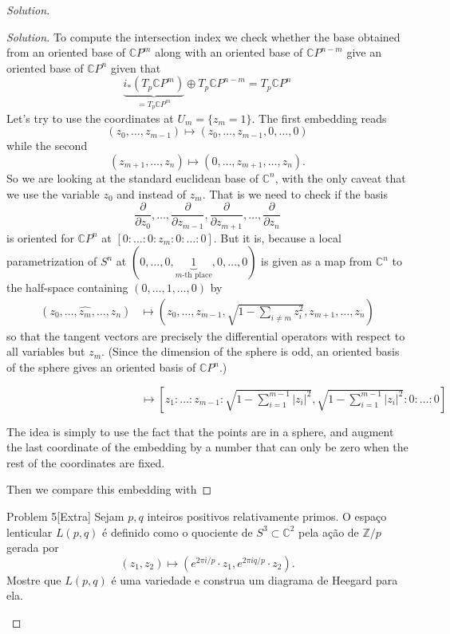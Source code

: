 \begin{proof}[Solution]
\begin{proof}[Solution]
To compute the intersection index we check whether the base obtained from an oriented base of \(\mathbb{C}P^{m}\) along with an oriented base of \(\mathbb{C}P^{n-m}\) give an oriented base of \(\mathbb{C}P^{n}\) given that
\[\underbrace{i_*(T_p \mathbb{C}P^{m})}_{=T_p\mathbb{C}P^m}\oplus T_p\mathbb{C}P^{n-m}=T_p\mathbb{C}P^{n}\]
Let's try to use the coordinates at \(U_m=\{z_m=1\}\). The first embedding reads
\[(z_0,\ldots,z_{m-1})\mapsto (z_0,\ldots,z_{m-1},0,\ldots,0)\]
while the second
\[(z_{m+1},\ldots,z_n)\mapsto (0,\ldots,z_{m+1},\ldots,z_n).\]
So we are looking at the standard euclidean base of \(\mathbb{C}^n\), with the only caveat that we use the variable \(z_0\) and instead of \(z_m\). That is we need to check if the basis
\[\frac{\partial }{\partial z_0},\ldots,\frac{\partial }{\partial z_{m-1}},\frac{\partial }{\partial z_{m+1}},\ldots,\frac{\partial }{\partial z_n}\]
is oriented for \(\mathbb{C}P^{n}\) at \([0:\ldots:0:z_m:0:\ldots:0]\). But it is, because a local parametrization of \(S^{n}\) at \((0,\ldots,0,\underbrace{1}_{m\text{-th place} },0,\ldots,0)\) is given as a map from \(\mathbb{C}^n\) to the half-space containing \((0,\ldots,1,\ldots,0)\) by
\begin{align*}
	(z_0,\ldots,\widehat{z_m},\ldots,z_n) &\longmapsto \left(z_0,\ldots,z_{m-1},\sqrt{1-\sum_{i\neq m}z_i^2} ,z_{m+1},\ldots,z_n\right) 
\end{align*}
so that the tangent vectors are precisely the differential operators with respect to all variables but \(z_m\). (Since the dimension of the sphere is odd, an oriented basis of the sphere gives an oriented basis of  \(\mathbb{C}P^{n}\).)


\(\qquad \qquad \qquad \qquad \qquad \qquad  \longmapsto \left[z_1:\ldots:z_{m-1}:\sqrt{1-\sum_{i=1}^{m-1}|z_i|^2},\sqrt{1-\sum_{i=1}^{m-1}|z_i|^2}:0:\ldots:0\right] \)

The idea is simply to use the fact that the points are in a sphere, and augment the last coordinate of the embedding by a number that can only be zero when the rest of the coordinates are fixed.

Then we compare this embedding with\fi
\end{proof}

\begin{thing1}{Problem 5}[Extra]\label{prob:5}\leavevmode
Sejam \(p,q\) inteiros positivos relativamente primos. O espaço lenticular \(L(p,q)\) é definido como o quociente de  \(S^3 \subset \mathbb{C}^2\) pela ação de \(\mathbb{Z}/p\) gerada por
\[(z_1,z_2)\mapsto (e^{2\pi i/p}\cdot z_1,e^{2\pi i q/p}\cdot z_2).\]
Mostre que \(L(p,q)\) é uma variedade e construa um diagrama de Heegard para ela.
\end{thing1}


\end{proof}
